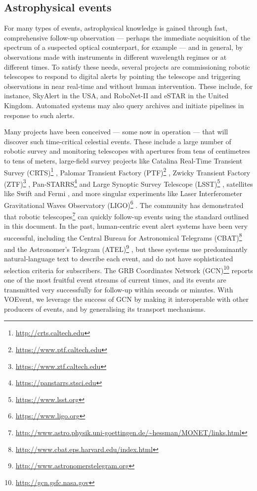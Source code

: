 \documentclass[11pt,a4paper]{ivoa}
\begin{document}
\subsection{Astrophysical events}

For many types of events, astrophysical knowledge is gained through fast,
comprehensive follow-up observation --- perhaps the immediate acquisition of the
spectrum of a suspected optical counterpart, for example --- and in general, by
observations made with instruments in different wavelength regimes or at
different times. To satisfy these needs, several projects are commissioning
robotic telescopes to respond to digital alerts by pointing the telescope and
triggering observations in near real-time and without human intervention. These
include, for instance, SkyAlert \citep{bib05} in the USA, and RoboNet-II
\citep{bib12} and eSTAR \citep{bib03} in the United Kingdom. Automated systems
may also query archives and initiate pipelines in response to such alerts.

Many projects have been conceived --- some now in operation --- that will
discover such time-critical celestial events. These include a large number of
robotic survey and monitoring telescopes with apertures from tens of centimetres
to tens of meters, large-field survey projects like Catalina Real-Time Transient
Survey (CRTS)\footnote{\url{http://crts.caltech.edu}} \citep{bib08}, Palomar
Transient Factory (PTF)\footnote{\url{https://www.ptf.caltech.edu}}
\citep{bib31}, Zwicky Transient Factory (ZTF)\footnote{
\url{https://www.ztf.caltech.edu}} \citep{2014htu..conf...27B},
Pan-STARRS\footnote{\url{https://panstarrs.stsci.edu}} \citep{bib09} and Large
Synoptic Survey Telescope (LSST)\footnote{\url{https://www.lsst.org}}
\citep{bib07}, satellites like Swift \citep{bib11a} and Fermi \citep{bib11b},
and more singular experiments like Laser Interferometer Gravitational Waves
Observatory (LIGO)\footnote{\url{https://www.ligo.org}} \citep{bib06}. The
community has demonstrated that robotic telescopes\footnote{
\url{http://www.astro.physik.uni-goettingen.de/~hessman/MONET/links.html}} can
quickly follow-up events using the standard outlined in this document. In the
past, human-centric event alert systems have been very successful, including the
Central Bureau for Astronomical Telegrams (CBAT)\footnote{
\url{http://www.cbat.eps.harvard.edu/index.html}} and the Astronomer's Telegram
(ATEL)\footnote{\url{http://www.astronomerstelegram.org}} \citep{bib01}, but
these systems use predominantly natural-language text to describe each event,
and do not have sophisticated selection criteria for subscribers. The GRB
Coordinates Network (GCN)\footnote{\url{http://gcn.gsfc.nasa.gov}} \citep{bib04}
reports one of the most fruitful event streams of current times, and its events
are transmitted very successfully for follow-up within seconds or minutes. With
VOEvent, we leverage the success of GCN by making it interoperable with other
producers of events, and by generalising its transport mechanisms.
\end{document}
